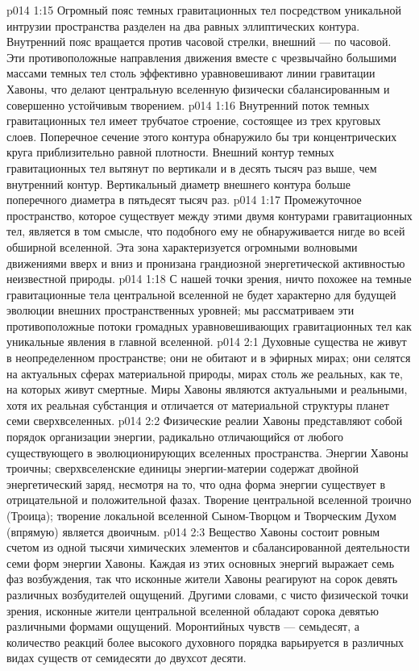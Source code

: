 \vs p014 1:15 Огромный пояс темных гравитационных тел посредством уникальной интрузии пространства разделен на два равных эллиптических контура. Внутренний пояс вращается против часовой стрелки, внешний --- по часовой. Эти противоположные направления движения вместе с чрезвычайно большими массами темных тел столь эффективно уравновешивают линии гравитации Хавоны, что делают центральную вселенную физически сбалансированным и совершенно устойчивым творением.
\vs p014 1:16 Внутренний поток темных гравитационных тел имеет трубчатое строение, состоящее из трех круговых слоев. Поперечное сечение этого контура обнаружило бы три концентрических круга приблизительно равной плотности. Внешний контур темных гравитационных тел вытянут по вертикали и в десять тысяч раз выше, чем внутренний контур. Вертикальный диаметр внешнего контура больше поперечного диаметра в пятьдесят тысяч раз.
\vs p014 1:17 Промежуточное пространство, которое существует между этими двумя контурами гравитационных тел, является  в том смысле, что подобного ему не обнаруживается нигде во всей обширной вселенной. Эта зона характеризуется огромными волновыми движениями вверх и вниз и пронизана грандиозной энергетической активностью неизвестной природы.
\vs p014 1:18 С нашей точки зрения, ничто похожее на темные гравитационные тела центральной вселенной не будет характерно для будущей эволюции внешних пространственных уровней; мы рассматриваем эти противоположные потоки громадных уравновешивающих гравитационных тел как уникальные явления в главной вселенной.
\vs p014 2:1 Духовные существа не живут в неопределенном пространстве; они не обитают и в эфирных мирах; они селятся на актуальных сферах материальной природы, мирах столь же реальных, как те, на которых живут смертные. Миры Хавоны являются актуальными и реальными, хотя их реальная субстанция и отличается от материальной структуры планет семи сверхвселенных.
\vs p014 2:2 Физические реалии Хавоны представляют собой порядок организации энергии, радикально отличающийся от любого существующего в эволюционирующих вселенных пространства. Энергии Хавоны троичны; сверхвселенские единицы энергии\hyp{}материи содержат двойной энергетический заряд, несмотря на то, что одна форма энергии существует в отрицательной и положительной фазах. Творение центральной вселенной троично (Троица); творение локальной вселенной Сыном\hyp{}Творцом и Творческим Духом (впрямую) является двоичным.
\vs p014 2:3 Вещество Хавоны состоит ровным счетом из одной тысячи химических элементов и сбалансированной деятельности семи форм энергии Хавоны. Каждая из этих основных энергий выражает семь фаз возбуждения, так что исконные жители Хавоны реагируют на сорок девять различных возбудителей ощущений. Другими словами, с чисто физической точки зрения, исконные жители центральной вселенной обладают сорока девятью различными формами ощущений. Моронтийных чувств --- семьдесят, а количество реакций более высокого духовного порядка варьируется в различных видах существ от семидесяти до двухсот десяти.

